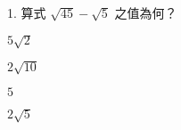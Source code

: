 \documentclass[12pt]{article}
\begin{document}
\begin{problem}
  \item[1.] 算式 $\sqrt{45} - \sqrt{5}$ 之值為何？
  \begin{choices}
    \item $5\sqrt{2}$
    \item $2\sqrt{10}$
    \item $5$
    \item $2\sqrt{5}$
  \end{choices}
\end{problem}
\end{document}
